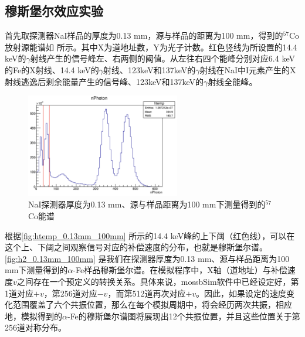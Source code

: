 \documentclass[font=default]{mpltx}
\begin{document}
\subsection{穆斯堡尔效应实验}
首先取探测器NaI样品的厚度为0.13 mm，源与样品的距离为100 mm，得到的$^{57}$Co放射源能谱如 所示。其中X为道地址数，Y为光子计数。红色竖线为所设置的14.4 keV的$\gamma$射线产生的信号峰左、右两侧的阈值。从左往右四个能峰分别对应6.4 keV的Fe的X射线、14.4 keV的$\gamma$射线、123keV和137keV的$\gamma$射线在NaI中I元素产生的X射线逃逸后剩余能量产生的信号峰、123keV和137keV的$\gamma$射线全能峰\cite{mossbSim}。
\begin{figure}[h]
  \centering
  \includegraphics[width=0.6\textwidth]{fig/DetThick/0.13mm/htemp.png}
  \caption{NaI探测器厚度为0.13 mm、源与样品距离为100 mm下测量得到的$^{57}$Co能谱}
  \label{fig:htemp_0.13mm_100mm}
\end{figure}

根据\autoref{fig:htemp_0.13mm_100mm} 所示的14.4 keV峰的上下阈（红色线），可以在这个上、下阈之间观察信号对应的补偿速度的分布，也就是穆斯堡尔谱。\autoref{fig:h2_0.13mm_100mm} 是我们在探测器厚度为0.13 mm、源与样品距离为100 mm下测量得到的$\alpha$-Fe样品穆斯堡尔谱。在模拟程序中，X轴（道地址）与补偿速度$v$之间存在一个预定义的转换关系。具体来说，mossbSim软件中已经设定好，第1道对应$+v$，第256道对应$-v$，而第512道再次对应$+v$。因此，如果设定的速度变化范围覆盖了六个共振位置，那么在每个模拟周期中，将会经历两次共振，相应地，模拟得到的$\alpha$-Fe的穆斯堡尔谱图将展现出12个共振位置，并且这些位置关于第256道对称分布。
\end{document}
